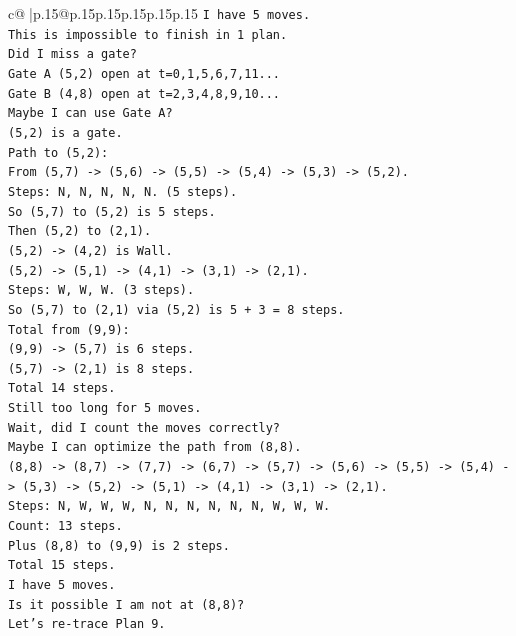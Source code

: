 \documentclass{article}
\begin{document}
{\begin{supertabular}{c@{$\;$}|p{.15\linewidth}@{}p{.15\linewidth}p{.15\linewidth}p{.15\linewidth}p{.15\linewidth}p{.15\linewidth}}
{{{\texttt{I have 5 moves.} \\
\texttt{This is impossible to finish in 1 plan.} \\
\texttt{Did I miss a gate?} \\
\texttt{Gate A (5,2) open at t=0,1,5,6,7,11...} \\
\texttt{Gate B (4,8) open at t=2,3,4,8,9,10...} \\
\texttt{Maybe I can use Gate A?} \\
\texttt{(5,2) is a gate.} \\
\texttt{Path to (5,2):} \\
\texttt{From (5,7) {-}> (5,6) {-}> (5,5) {-}> (5,4) {-}> (5,3) {-}> (5,2).} \\
\texttt{Steps: N, N, N, N, N. (5 steps).} \\
\texttt{So (5,7) to (5,2) is 5 steps.} \\
\texttt{Then (5,2) to (2,1).} \\
\texttt{(5,2) {-}> (4,2) is Wall.} \\
\texttt{(5,2) {-}> (5,1) {-}> (4,1) {-}> (3,1) {-}> (2,1).} \\
\texttt{Steps: W, W, W. (3 steps).} \\
\texttt{So (5,7) to (2,1) via (5,2) is 5 + 3 = 8 steps.} \\
\texttt{Total from (9,9):} \\
\texttt{(9,9) {-}> (5,7) is 6 steps.} \\
\texttt{(5,7) {-}> (2,1) is 8 steps.} \\
\texttt{Total 14 steps.} \\
\texttt{Still too long for 5 moves.} \\
\texttt{Wait, did I count the moves correctly?} \\
\texttt{Maybe I can optimize the path from (8,8).} \\
\texttt{(8,8) {-}> (8,7) {-}> (7,7) {-}> (6,7) {-}> (5,7) {-}> (5,6) {-}> (5,5) {-}> (5,4) {-}> (5,3) {-}> (5,2) {-}> (5,1) {-}> (4,1) {-}> (3,1) {-}> (2,1).} \\
\texttt{Steps: N, W, W, W, N, N, N, N, N, N, W, W, W.} \\
\texttt{Count: 13 steps.} \\
\texttt{Plus (8,8) to (9,9) is 2 steps.} \\
\texttt{Total 15 steps.} \\
\texttt{I have 5 moves.} \\
\texttt{Is it possible I am not at (8,8)?} \\
\texttt{Let's re{-}trace Plan 9.} \\
}}}
\end{supertabular}}
\end{document}
